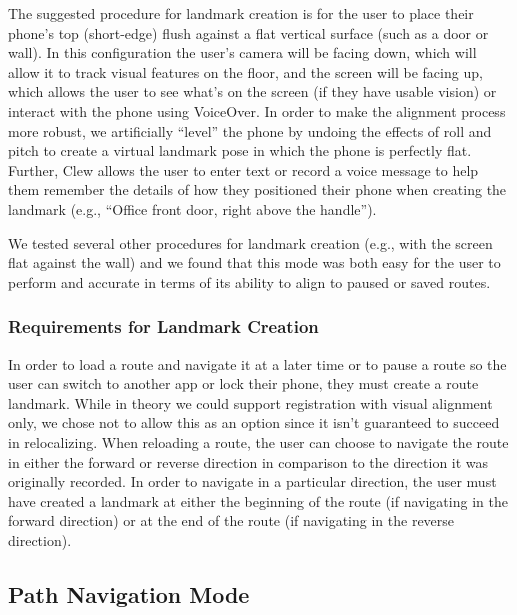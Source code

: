 \documentclass[chi_draft]{sigchi}
\begin{document}
The suggested procedure for landmark creation is for the user to place their phone's top (short-edge) flush against a flat vertical surface (such as a door or wall).  In this configuration the user's camera will be facing down, which will allow it to track visual features on the floor, and the screen will be facing up, which allows the user to see what's on the screen (if they have usable vision) or interact with the phone using VoiceOver.  In order to make the alignment process more robust, we artificially ``level'' the phone by undoing the effects of roll and pitch to create a virtual landmark pose in which the phone is perfectly flat.  Further, Clew allows the user to enter text or record a voice message to help them remember the details of how they positioned their phone when creating the landmark (e.g., ``Office front door, right above the handle'').

We tested several other procedures for landmark creation (e.g., with the screen flat against the wall) and we found that this mode was both easy for the user to perform and accurate in terms of its ability to align to paused or saved routes.

\subsubsection{Requirements for Landmark Creation}

In order to load a route and navigate it at a later time or to pause a route so the user can switch to another app or lock their phone, they must create a route landmark.  While in theory we could support registration with visual alignment only, we chose not to allow this as an option since it isn't guaranteed to succeed in relocalizing.  When reloading a route, the user can choose to navigate the route in either the forward or reverse direction in comparison to the direction it was originally recorded.  In order to navigate in a particular direction, the user must have created a landmark at either the beginning of the route (if navigating in the forward direction) or at the end of the route (if navigating in the reverse direction).

\subsection{Path Navigation Mode}\label{sec:pathnavigationmode}
\end{document}
